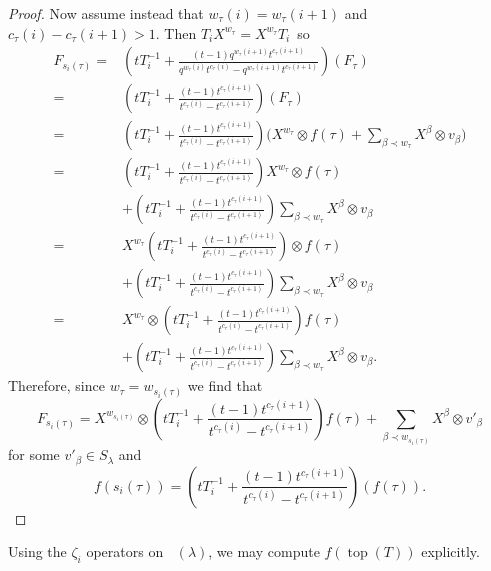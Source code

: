 \documentclass[10pt,a4paper]{amsart}
\numberwithin{equation}{section}
\theoremstyle{definition}
\DeclareMathOperator{\PSYT}{\mathrm{PSYT}_{\geq 0}}
\DeclareMathOperator{\Top}{\mathrm{top}}
\begin{document}
\begin{proof}
 Now assume instead that $w_{\tau}(i) = w_{\tau}(i+1)$ and $c_{\tau}(i) - c_{\tau}(i+1) > 1$. Then ${T_iX^{w_{\tau}} = X^{w_{\tau}}T_i}$~so
 \begin{align*}
 F_{s_i(\tau)} = {}&\left( tT_{i}^{-1} + \frac{(t-1)q^{w_{\tau}(i+1)}t^{c_{\tau}(i+1)}}{q^{w_{\tau}(i)}t^{c_{\tau}(i)}-q^{w_{\tau}(i+1)}t^{c_{\tau}(i+1)}}\right)(F_{\tau}) \\
 = {}& \left( tT_{i}^{-1} + \frac{(t-1)t^{c_{\tau}(i+1)}}{t^{c_{\tau}(i)}-t^{c_{\tau}(i+1)}}\right)(F_{\tau}) \\
 = {}& \left( tT_{i}^{-1} + \frac{(t-1)t^{c_{\tau}(i+1)}}{t^{c_{\tau}(i)}-t^{c_{\tau}(i+1)}}\right) \biggl(X^{w_{\tau}}\otimes f(\tau) + \sum_{\beta \prec w_{\tau}} X^{\beta}\otimes v_{\beta} \biggr) \\
 = {}& \left( tT_{i}^{-1} + \frac{(t-1)t^{c_{\tau}(i+1)}}{t^{c_{\tau}(i)}-t^{c_{\tau}(i+1)}}\right)X^{w_{\tau}}\otimes f(\tau) \\
 &+ \left( tT_{i}^{-1} + \frac{(t-1)t^{c_{\tau}(i+1)}}{t^{c_{\tau}(i)}-t^{c_{\tau}(i+1)}}\right)\sum_{\beta \prec w_{\tau}} X^{\beta}\otimes v_{\beta} \\
 = {}& X^{w_{\tau}}\left( tT_{i}^{-1} + \frac{(t-1)t^{c_{\tau}(i+1)}}{t^{c_{\tau}(i)}-t^{c_{\tau}(i+1)}}\right)\otimes f(\tau) \\
 &+ \left( tT_{i}^{-1} + \frac{(t-1)t^{c_{\tau}(i+1)}}{t^{c_{\tau}(i)}-t^{c_{\tau}(i+1)}}\right)\sum_{\beta \prec w_{\tau}} X^{\beta}\otimes v_{\beta} \\
 = {}& X^{w_{\tau}} \otimes \left( tT_{i}^{-1} + \frac{(t-1)t^{c_{\tau}(i+1)}}{t^{c_{\tau}(i)}-t^{c_{\tau}(i+1)}}\right) f(\tau)\\
 &+ \left( tT_{i}^{-1} + \frac{(t-1)t^{c_{\tau}(i+1)}}{t^{c_{\tau}(i)}-t^{c_{\tau}(i+1)}}\right)\sum_{\beta \prec w_{\tau}} X^{\beta}\otimes v_{\beta}.
 \end{align*}
 Therefore, since $w_{\tau} = w_{s_i(\tau)}$ we find that
 \[
 F_{s_i(\tau)} = X^{w_{s_i(\tau)}}\otimes \left( tT_{i}^{-1} + \frac{(t-1)t^{c_{\tau}(i+1)}}{t^{c_{\tau}(i)}-t^{c_{\tau}(i+1)}}\right) f(\tau) + \sum_{\beta \prec w_{s_i(\tau)}} X^{\beta}\otimes v'_{\beta}
 \]
 for some $v'_{\beta} \in S_{\lambda}$ and
 \[
 f(s_i(\tau)) = \left( tT_i^{-1} + \frac{(t-1)t^{c_{\tau}(i+1)}}{t^{c_{\tau}(i)} - t^{c_{\tau}(i+1)}} \right)(f(\tau)).\tag*{\qed}
 \] \renewcommand{\qed}{}
\end{proof}

Using the $\zeta_i$ operators on $\PSYT(\lambda)$, we may compute $f(\Top(T))$ explicitly.
\end{document}
